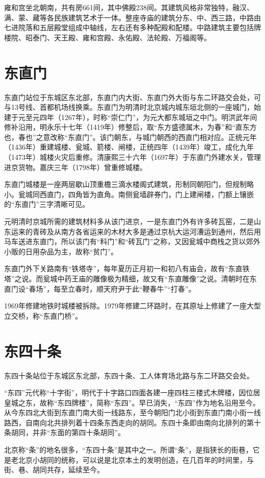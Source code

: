 雍和宫坐北朝南，共有房661间，其中佛殿238间。其建筑风格非常独特，融汉、满、蒙、藏等各民族建筑艺术于一体。整座寺庙的建筑分东、中、西三路，中路由七进院落和五层殿堂组成中轴线，左右还有多种配殿和配楼。中路建筑主要包括牌楼院、昭泰门、天王殿、雍和宫殿、永佑殿、法轮殿、万福阁等。

\section{东直门}
东直门站位于东城区东北部，东直门内大街、东直门外大街与东二环路交会处，可与13号线、首都机场线换乘。东直门为明清时北京城内城东垣北侧的一座城门，始建于元至元四年（1267年），时称“崇仁门”，为元大都东城垣之中门。明洪武年间修补沿用，明永乐十七年（1419年）修整后，取“东方盛德属木，为春”和“直东方也，春也”之意改称“东直门”。该门朝东，与城门朝西的西直门相对应。正统元年（1436年）重建城楼、瓮城、箭楼、闸楼，正统四年（1439年）竣工，成化九年（1473年）城楼火灾后重修。清康熙三十六年（1697年）于东直门外建水关，管理进京货物。嘉庆三年（1798年）曾重修城楼。

东直门城楼是一座两层歇山顶重檐三滴水楼阁式建筑，形制同朝阳门，但规制略小。瓮城同西直门，四角皆为直角。南侧瓮墙辟券门，门上建闸楼，门额上镶嵌的“东直门”三字清晰可见。

元明清时京城所需的建筑材料多从该门进京，一是东直门外有许多砖瓦窑，二是山东运来的青砖及从南方各省运来的木材大多是通过京杭大运河漕运到通州，然后用马车送进东直门，所以该门有“料门”和“砖瓦门”之称，又因瓮城中商栈之货以郊外小贩的日用杂品为主，故称“贫门”。

东直门外下关路南有“铁塔寺”，每年夏历正月初一和初八有庙会，故有“东直铁塔”之说。而瓮城中药王庙的雕像极为精细，故又有“东直雕像”之说。清朝时在东直门设“春场”，每至立春时，顺天府尹于此“鞭春牛”“打春”。

1969年修建地铁时城楼被拆除。1979年修建二环路时，在其原址上修建了一座大型立交桥，称“东直门桥”。

\section{东四十条}
东四十条站位于东城区东北部，东四十条、工人体育场北路与东二环路交会处。

“东四”元代称“十字街”，明代于十字路口四面各建一座四柱三楼式木牌楼，因位居皇城之东，故称“东四牌楼”，简称“东四”。早已消失，“东四”作为地名沿用至今。从今东四北大街到东直门南大街一线路东，至今朝阳门北小街到东直门南小街一线路西，自南向北共排列着十四条东西走向的胡同。东四十条即由南向北排列的第十条胡同，并非“东面的第四十条胡同”。

北京称“条”的地名很多，“东四十条”是其中之一。所谓“条”，是指狭长的街巷，它是老北京小胡同的统称，可以说是北京本土的发明创造，在几百年的时间里，与街、巷、胡同共存，延续至今。

